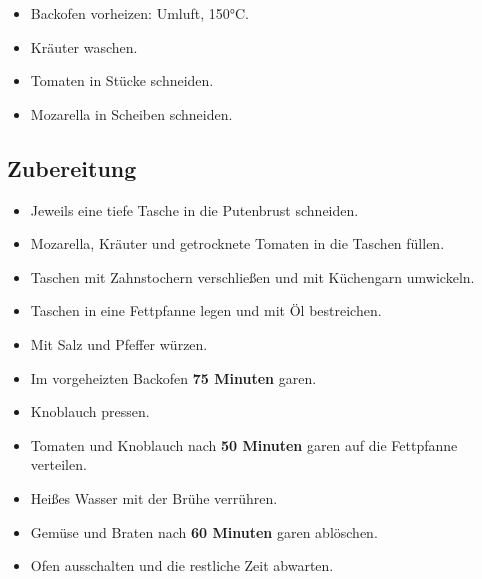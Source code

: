 \begin{itemize}
    \item Backofen vorheizen: Umluft, 150°C.
    \item Kräuter waschen.
    \item Tomaten in Stücke schneiden.
    \item Mozarella in Scheiben schneiden.
\end{itemize}



\bigbreak
\subsection*{Zubereitung}

\begin{itemize}
    \item Jeweils eine tiefe Tasche in die Putenbrust schneiden.
    \item Mozarella, Kräuter und getrocknete Tomaten in die Taschen füllen.
    \item Taschen mit Zahnstochern verschließen und mit Küchengarn umwickeln.
    \item Taschen in eine Fettpfanne legen und mit Öl bestreichen.
    \item Mit Salz und Pfeffer würzen.
    \item Im vorgeheizten Backofen \textbf{75 Minuten} garen.
    \item Knoblauch pressen.
    \item Tomaten und Knoblauch nach \textbf{50 Minuten} garen auf die Fettpfanne verteilen.
    \item Heißes Wasser mit der Brühe verrühren.
    \item Gemüse und Braten nach \textbf{60 Minuten} garen ablöschen.
    \item Ofen ausschalten und die restliche Zeit abwarten.
\end{itemize}


